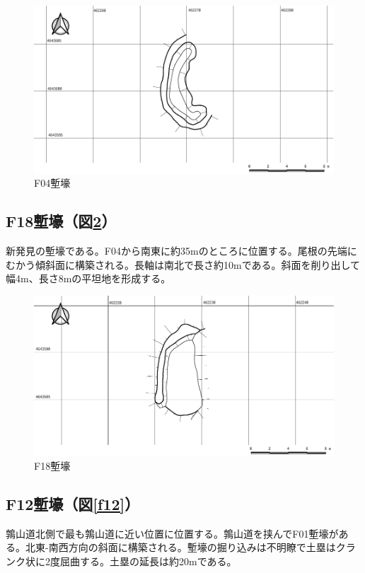 \documentclass[14Q]{jsarticle}
\begin{document}
\begin{figure}[h]
\centering
\includegraphics[width=160truemm]{fig/F04.pdf}
\caption{F04塹壕}
\label{f04}
\end{figure}

\subsection{F18塹壕（図\ref{f18}）}
新発見の塹壕である。F04から南東に約35mのところに位置する。尾根の先端にむかう傾斜面に構築される。長軸は南北で長さ約10mである。斜面を削り出して幅4m、長さ8mの平坦地を形成する。

\begin{figure}[h]
\centering
\includegraphics[width=160truemm]{fig/F18.pdf}
\caption{F18塹壕}
\label{f18}
\end{figure}

\subsection{F12塹壕（図\ref{f12}）}
鶉山道北側で最も鶉山道に近い位置に位置する。鶉山道を挟んでF01塹壕がある。北東-南西方向の斜面に構築される。塹壕の掘り込みは不明瞭で土塁はクランク状に2度屈曲する。土塁の延長は約20mである。
\end{document}

